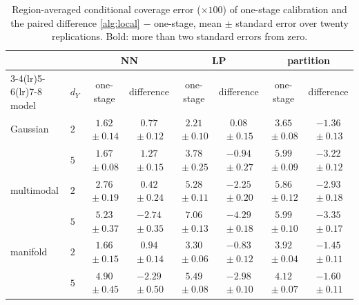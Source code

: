 \begin{table}[!t]
\caption{Region-averaged conditional coverage error ($\times100$) of one-stage calibration and the paired difference \cref{alg:local} $-$ one-stage, mean $\pm$ standard error over twenty replications. Bold: more than two standard errors from zero.}\label{tab:paired}
\centering\small
\begin{tabular}{llcccccc}
\toprule
 & & \multicolumn{2}{c}{NN} & \multicolumn{2}{c}{LP} & \multicolumn{2}{c}{partition}\\
\cmidrule(lr){3-4}\cmidrule(lr){5-6}\cmidrule(lr){7-8}
model & $d_Y$ & one-stage & difference & one-stage & difference & one-stage & difference\\
\midrule
Gaussian & $2$ & $1.62${\scriptsize${}\pm0.14$} & {\boldmath$0.77${\scriptsize${}\pm0.12$}} & $2.21${\scriptsize${}\pm0.10$} & $0.08${\scriptsize${}\pm0.15$} & $3.65${\scriptsize${}\pm0.08$} & {\boldmath$-1.36${\scriptsize${}\pm0.13$}}\\
 & $5$ & $1.67${\scriptsize${}\pm0.08$} & {\boldmath$1.27${\scriptsize${}\pm0.15$}} & $3.78${\scriptsize${}\pm0.25$} & {\boldmath$-0.94${\scriptsize${}\pm0.27$}} & $5.99${\scriptsize${}\pm0.09$} & {\boldmath$-3.22${\scriptsize${}\pm0.12$}}\\
\addlinespace[2pt]
multimodal & $2$ & $2.76${\scriptsize${}\pm0.19$} & $0.42${\scriptsize${}\pm0.24$} & $5.28${\scriptsize${}\pm0.11$} & {\boldmath$-2.25${\scriptsize${}\pm0.20$}} & $5.86${\scriptsize${}\pm0.12$} & {\boldmath$-2.93${\scriptsize${}\pm0.18$}}\\
 & $5$ & $5.23${\scriptsize${}\pm0.37$} & {\boldmath$-2.74${\scriptsize${}\pm0.35$}} & $7.06${\scriptsize${}\pm0.13$} & {\boldmath$-4.29${\scriptsize${}\pm0.18$}} & $5.99${\scriptsize${}\pm0.10$} & {\boldmath$-3.35${\scriptsize${}\pm0.17$}}\\
\addlinespace[2pt]
manifold & $2$ & $1.66${\scriptsize${}\pm0.15$} & {\boldmath$0.94${\scriptsize${}\pm0.14$}} & $3.30${\scriptsize${}\pm0.06$} & {\boldmath$-0.83${\scriptsize${}\pm0.12$}} & $3.92${\scriptsize${}\pm0.04$} & {\boldmath$-1.45${\scriptsize${}\pm0.11$}}\\
 & $5$ & $4.90${\scriptsize${}\pm0.45$} & {\boldmath$-2.29${\scriptsize${}\pm0.50$}} & $5.49${\scriptsize${}\pm0.08$} & {\boldmath$-2.98${\scriptsize${}\pm0.10$}} & $4.12${\scriptsize${}\pm0.07$} & {\boldmath$-1.60${\scriptsize${}\pm0.11$}}\\
\bottomrule
\end{tabular}
\end{table}
